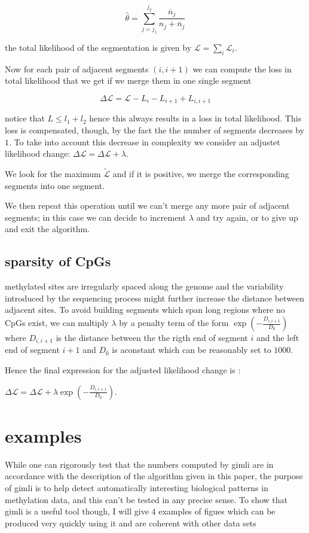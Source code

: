 \documentclass[11pt]{amsart}
\newcommand{\lik}{\ensuremath{\mathcal{L}}}
\begin{document}
\[
\hat{\theta}=\sum_{j=j_1}^{j_2} \frac{\overline{n}_j}{n_j+\overline{n}_j}
\]


the total likelihood of the segmentation is given by $\mathcal{L}=\sum_i\mathcal{L}_i$.

Now for each pair of adjacent segments $(i,i+1)$ we can compute the loss in total likelihood that we get if we merge them
in one single segment

\[\Delta \lik=\lik-L_i-L_{i+1}+L_{i,i+1}\]

notice that $L \leq l_1+l_2$ hence this always results in a loss in total likelihood. This loss is compensated, though, by the fact the the number of segments decreases by $1$. To take into account this decrease in complexity we consider an adjustet likelihood change:
$\Delta \lik = \Delta \lik+\lambda$.

We look for the maximum $\tilde{\lik}$ and if it is positive, we merge the corresponding segments into one segment.

We then repeat this operation until we can't merge any more pair of adjacent segments; in this case we can decide to increment 
$\lambda$ and try again, or to give up and exit the algorithm.

\subsection{sparsity of CpGs}

methylated sites are irregularly spaced along the genome and the variability introduced by the sequencing process might further increase the distance between adjacent sites.
To avoid building segments which span long regions where no CpGs exist, we can multiply $\lambda$ by a penalty term of the
form $\exp(-\frac{D_{i,i+1}}{D_0})$ where $D_{i,i+1}$ is the distance between the the rigth end of segment $i$ and the left end of segment $i+1$ and $D_0$ is aconstant which can be reasonably set to $1000$. 

Hence the final expression for the adjusted likelihood change is :

$\Delta \lik = \Delta \lik+\lambda \exp(-\frac{D_{i,i+1}}{D_0}) $.

\section{examples}

While one can rigorously test that the numbers computed by gimli are in accordance with the description
of the algorithm given in this paper, the purpose of gimli is to help detect automatically interesting
biological patterns in methylation data, and this can't be tested in any precise sense. To show that gimli is a useful tool
 though, I will give 4 examples of figues which can be produced very quickly using it and are coherent with other data sets
\end{document}
